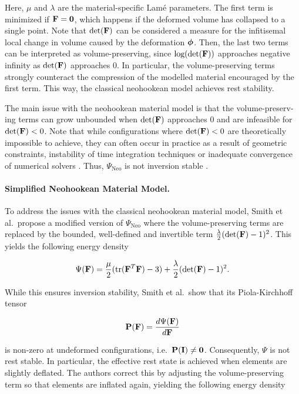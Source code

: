 \noindent Here, $\mu$ and $\lambda$ are the material-specific Lamé parameters. The first term is minimized if $\mathbf{F} = \mathbf{0}$, which 
happens if the deformed volume has collapsed to a single point. Note that $\text{det}(\mathbf{F})$ can be considered a measure for the 
infitisemal local change in volume caused by the deformation $\bm{\phi}$. Then, the last two terms can be interpreted as volume-preserving, 
since $\text{log}(\text{det}(\mathbf{F}))$ approaches negative infinity as $\text{det}(\mathbf{F})$ approaches $0$. In particular, 
the volume-preserving terms strongly counteract the compression of the modelled material encouraged by the first term. This way, the 
classical neohookean model achieves rest stability.

The main issue with the neohookean material model is that the volume-preserv-ing terms can grow unbounded when $\text{det}(\mathbf{F})$ approaches 
$0$ and are infeasible for $\text{det}(\mathbf{F}) < 0$. Note that while configurations where $\text{det}(\mathbf{F}) < 0$ are theoretically 
impossible to achieve, they can often occur in practice as a result of geometric constraints, instability of time integration techniques or 
inadequate convergence of numerical solvers \cite{sifakis2012}. Thus, $\Psi_{\text{Neo}}$ is not inversion stable \cite{smith2018}.

\paragraph{Simplified Neohookean Material Model.}
To address the issues with the classical neohookean material model, Smith et al.\ propose a modified version of $\Psi_{\text{Neo}}$ where 
the volume-preserving terms are replaced by the bounded, well-defined and invertible term $\frac{\lambda}{2}(\text{det}(\mathbf{F}) - 1)^2$. 
This yields the following energy density

\[
    \Psi(\mathbf{F}) = \frac{\mu}{2}(\text{tr}(\mathbf{F}^T\mathbf{F}) - 3) + \frac{\lambda}{2}(\text{det}(\mathbf{F})-1)^2.
\]

\noindent While this ensures inversion stability, Smith et al.\ show that its Piola-Kirchhoff tensor 

\[
    \mathbf{P}(\mathbf{F}) = \frac{d\Psi(\mathbf{F})}{d\mathbf{F}}
\]

\noindent is non-zero at undeformed configurations, i.e.\ $\mathbf{P}(\mathbf{I}) \neq \mathbf{0}$. Consequently, $\Psi$ is not rest stable. In particular,
the effective rest state is achieved when elements are slightly deflated. The authors correct this by adjusting the volume-preserving term so that 
elements are inflated again, yielding the following energy density

